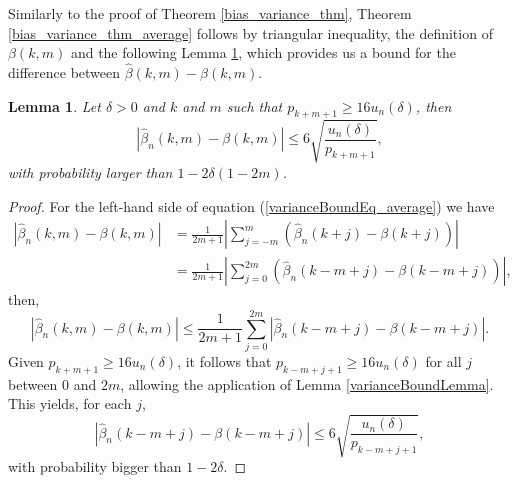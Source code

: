 \documentclass[sn-mathphys-ay]{sn-jnl}%
\newtheorem{lemma}{Lemma}[section]
\begin{document}
\begin{appendices}
Similarly to the proof of Theorem \ref{bias_variance_thm}, Theorem
\ref{bias_variance_thm_average} follows by triangular inequality, the definition of
$\beta \left( {k,m} \right) $ and the following Lemma
\ref{varianceBoundLemma_average}, which provides us a bound for the difference
between \(\widehat{\beta}(k,m)-\beta(k,m)\).

\begin{lemma}\label{varianceBoundLemma_average}
    Let \(\delta>0\) and \(k\) and \(m\) such that \(p_{k+m+1}\geq
    16u_n(\delta)\), then
    \begin{equation}\label{varianceBoundEq_average}
        \left| {\widehat \beta_n (k,m) - \beta (k,m)} \right| \leqslant 6\sqrt {\frac{{{u_n}(\delta )}}{{{p_{k + m + 1}}}}} ,
    \end{equation}
    with probability larger than \(1 - 2\delta \left( {1 - 2m} \right)\).
\end{lemma}
\begin{proof}
    For the left-hand side of equation (\ref{varianceBoundEq_average}) we have
    \begin{align*}
        \left| {\widehat \beta_n (k,m) - \beta (k,m)} \right| & = \frac{1}{{2m + 1}}\left| {\sum\limits_{j =  - m}^m {\left( {\widehat \beta_n \left( {k + j} \right) - \beta \left( {k + j} \right)} \right)} } \right|          \\
                                                              & = \frac{1}{{2m + 1}}\left| {\sum\limits_{j = 0}^{2m} {\left( {\widehat \beta_n \left( {k - m + j} \right) - \beta \left( {k - m + j} \right)} \right)} } \right|,
    \end{align*}
    then,
    \begin{equation}\label{eqn_lhh_diff_b_hat_b}
        \left| {\widehat \beta_n (k,m) - \beta (k,m)} \right| \leqslant \frac{1}{{2m + 1}}\sum\limits_{j = 0}^{2m} {\left| {\widehat \beta_n \left( {k - m + j} \right) - \beta \left( {k - m + j} \right)} \right|}.
    \end{equation}
    Given \(p_{k+m+1}\geq 16 u_n(\delta)\), it follows that \({p_{k - m + j +
                    1}} \geqslant 16{u_n}(\delta )\) for all \(j\) between 0 and \(2m\),
    allowing the application of Lemma \ref{varianceBoundLemma}. This yields, for
    each \(j\),
    \begin{equation}\label{particularBound_j}
        \left| {\widehat \beta_n \left( {k - m + j} \right) - \beta \left( {k - m + j} \right)} \right| \leqslant 6\sqrt {\frac{{{u_n}(\delta )}}{{{p_{k - m + j + 1}}}}},
    \end{equation}
    with probability bigger than \(1-2\delta\).


\end{proof}
\end{appendices}
\end{document}
